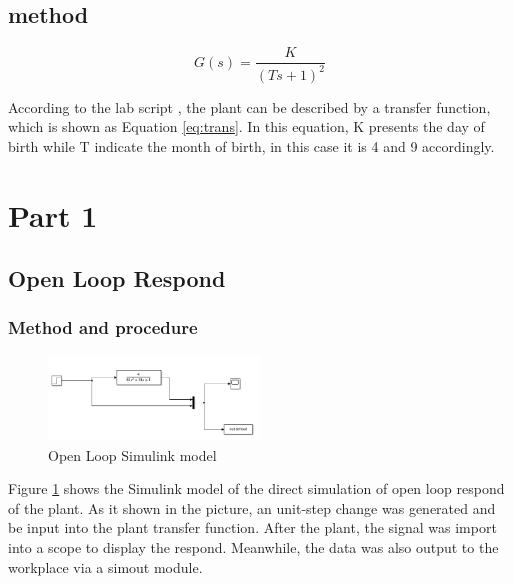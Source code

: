 \documentclass[11pt, a4paper]{article}
\begin{document}
\subsection{method}

\begin{equation}
G(s) = \frac{K}{(Ts+1)^2}
\label{eq:trans}
\end{equation}

According to the lab script \cite{ref:lab}, the plant can be described by a transfer function, which is shown as Equation \ref{eq:trans}. In this equation, K presents the day of birth while T indicate the month of birth, in this case it is 4 and 9 accordingly.

\section{Part 1}
\subsection{Open Loop Respond}

\subsubsection{Method and procedure}

\begin{figure}[htbp]     \begin{centering}
    \includegraphics[width=0.5\textwidth]{p1_1.png}
    \caption{\label{Fig:p1_1}Open Loop Simulink model}
    \end{centering}
\end{figure}

Figure \ref{Fig:p1_1} shows the Simulink model of the direct simulation of open loop respond of the plant. As it shown in the picture, an unit-step change was generated and be input into the plant transfer function. After the plant, the signal was import into a scope to display the respond. Meanwhile, the data was also output to the workplace via a simout module.
\end{document}
